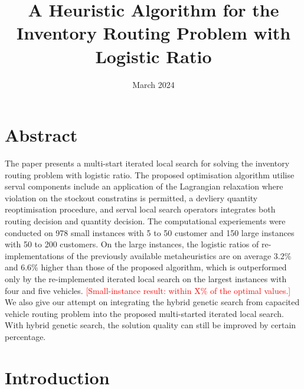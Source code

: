 \documentclass{article}
\title{A Heuristic Algorithm for the Inventory Routing Problem with Logistic Ratio}
\date{March 2024}
\begin{document}
\maketitle

\section{Abstract}

The paper presents a multi-start iterated local search  for solving the inventory routing problem with logistic ratio. The proposed optimisation algorithm utilise serval components include an application of the Lagrangian relaxation where violation on the stockout constratins is permitted, a devliery quantity reoptimisation procedure, and serval local search operators integrates both routing decision and quantity decision. The computational experiements were conducted on 978 small instances with 5 to 50 customer and 150 large instances with 50 to 200 customers. On the large instances, the logistic ratios of re-implementations of the previously available metaheuristics are on average 3.2\% and 6.6\% higher than those of the proposed algorithm, which is outperformed only by the re-implemented iterated local search on the largest instances with four and five vehicles. \textcolor{red}{[Small-instance result: within X\% of the optimal values.]} We also give our attempt on integrating the hybrid genetic search from capacited vehicle routing problem into the proposed multi-started iterated local search. With hybrid genetic search, the solution quality can still be improved by certain percentage.



\section{Introduction}
\label{sec:introduction}
\end{document}
